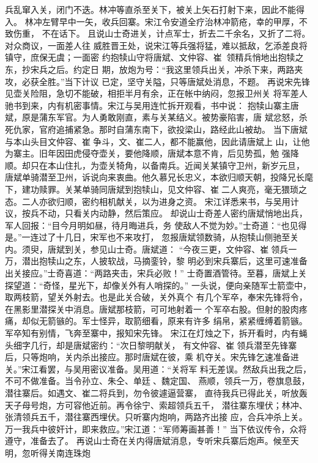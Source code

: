 兵乱窜入关，闭门不迭。林冲等直杀至关下，被关上矢石打射下来，因此不能得入。
林冲左臂早中一矢，收兵回寨。宋江令安道全疗治林冲箭疮，幸的甲厚，不致伤重，
不在话下。
且说山士奇进关，计点军士，折去二千余名，又折了二将。对众商议，一面差人往
威胜晋王处，说宋江等兵强将猛，难以抵敌，乞添差良将镇守，庶保无虞；一面密
约抱犊山守将唐斌、文仲容、崔，领精兵悄地出抱犊之东，抄宋兵之后。约定日
期，放炮为号：“我这里领兵出关，冲杀下来，两路夹攻，必获全胜。”当下计议
已定，坚守关隘，只等唐斌处消息，不题。
再说宋先锋见壶关险阻，急切不能破，相拒半月有余，正在帐中纳闷，忽报卫州关
将军差人驰书到来，内有机密事情。宋江与吴用连忙拆开观看，书中说：
抱犊山寨主唐斌，原是蒲东军官。为人勇敢刚直，素与关某结义。被势豪陷害，唐
斌忿怒，杀死仇家，官府追捕紧急。那时自蒲东南下，欲投梁山，路经此山被劫。
当下唐斌与本山头目文仲容、崔争斗，文、崔二人，都不能赢他，因此请唐斌上
山，让他为寨主。旧年因田虎侵夺壶关，要他降顺，唐斌本意不肯，后见势孤，勉
强降顺。却只在本山住扎，为壶关犄角，以备南兵。近闻关某镇守卫州，新岁元旦，
唐斌单骑潜至卫州，诉说向来衷曲。他久慕兄长忠义，本欲归顺天朝，投降兄长麾
下，建功赎罪。关某单骑同唐斌到抱犊山，见文仲容、崔二人爽亮，毫无猥琐之
态。二人亦欲归顺，密约相机献关，以为进身之资。
宋江详悉来书，与吴用计议，按兵不动，只看关内动静，然后策应。
却说山士奇差人密约唐斌悄地出兵，军人回报：“目今月明如昼，待月晦进兵，务
使敌人不觉为妙。”士奇道：“也见得是。”一连过了十几日，宋军也不来攻打，
忽报唐斌领数骑，从抱犊山侧驰至关内。须臾，唐斌到关，参见山士奇。唐斌道：
“今夜三更，文仲容、崔领兵一万，潜出抱犊山之东，人披软战，马摘銮铃，黎
明必到宋兵寨后，这里可速准备出关接应。”士奇喜道：“两路夹击，宋兵必败！”
士奇置酒管待。至暮，唐斌上关探望道：“奇怪，星光下，却像关外有人哨探的。”
一头说，便向亲随军士箭壶中，取两枝箭，望关外射去。也是此关合破，关外真个
有几个军卒，奉宋先锋将令，在黑影里潜探关中消息。唐斌那枝箭，可可地射着一
个军卒右股。但射的股肉疼痛，却似无箭镞的。军士怪异，取箭细看，原来有许多
绢帛，紧紧缠缚着箭镞。军卒知有别情，飞奔至寨中，报知宋先锋。
宋江在灯烛之下，拆开看时，内有蝇头细字几行，却是唐斌密约：“次日黎明献关，
有文仲容、崔领兵潜至先锋寨后，只等炮响，关内杀出接应。那时唐斌在彼，乘
机夺关。宋先锋乞速准备进关。”宋江看罢，与吴用密议准备。吴用道：“关将军
料无差误。然敌兵出我之后，不可不做准备。当令孙立、朱仝、单廷、魏定国、
燕顺，领兵一万，卷旗息鼓，潜往寨后。如遇文、崔二将兵到，勿令彼遽逼营寨，
直待我兵已得此关，听放轰天子母号炮，方可容他近前。再令徐宁、索超领兵五千，
潜往寨东埋伏；林冲、张清领兵五千，潜往寨西埋伏。只听寨内炮响，两路齐出接
应，合兵冲杀上关。万一我兵中彼奸计，即来救应。”宋江道：“军师筹画甚善！”
当下依议传令，众将遵守，准备去了。
再说山士奇在关内得唐斌消息，专听宋兵寨后炮声。候至天明，忽听得关南连珠炮

